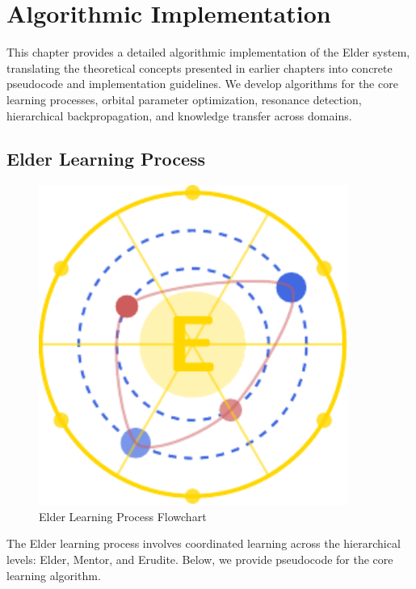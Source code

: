 \chapter{Algorithmic Implementation}

This chapter provides a detailed algorithmic implementation of the Elder system, translating the theoretical concepts presented in earlier chapters into concrete pseudocode and implementation guidelines. We develop algorithms for the core learning processes, orbital parameter optimization, resonance detection, hierarchical backpropagation, and knowledge transfer across domains.

\section{Elder Learning Process}

\begin{figure}[htbp]
\centering
\includegraphics[width=0.9\textwidth]{figures/elder_symbol.pdf}
\caption{Elder Learning Process Flowchart}
\label{fig:learning_process_flowchart}
\end{figure}

The Elder learning process involves coordinated learning across the hierarchical levels: Elder, Mentor, and Erudite. Below, we provide pseudocode for the core learning algorithm.


